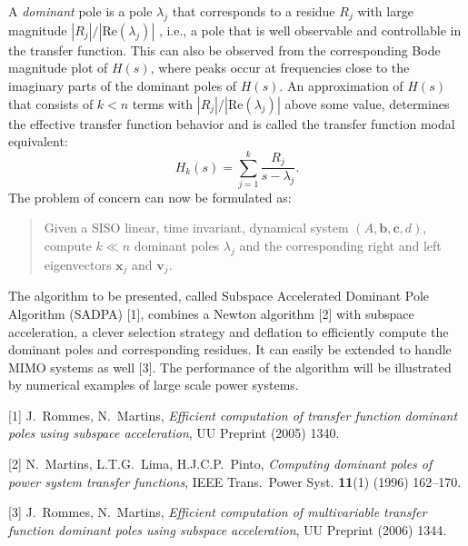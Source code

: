 \documentclass[twosided]{report}
\begin{document}
A \textit{dominant} pole is a pole $\lambda_j$ that
corresponds to a residue $R_j$ with large magnitude
$|R_j| / |\mbox{Re}(\lambda_j)|$ , i.e.,
a pole that is well
observable and controllable in the transfer function. This
can also be observed from the corresponding Bode magnitude
plot of $H(s)$, where peaks occur at frequencies close to
the imaginary parts of the dominant poles of $H(s)$. An
approximation of $H(s)$ that consists of $k<n$ terms with
$|R_j|/|\mbox{Re}(\lambda_j)|$ above some value, determines
the effective transfer function behavior and is called the
transfer function modal equivalent:
$$ H_k(s) = \sum_{j=1}^k \frac{R_j}{s - \lambda_j}. $$
The problem of concern can now be formulated as:
\begin{quote}
Given a SISO linear, time invariant,
dynamical system
$(A,\mathbf{b},\mathbf{c},d)$,
compute $k\ll n$ dominant
poles $\lambda_j$ and the corresponding right and left
eigenvectors $\mathbf{x}_j$ and $\mathbf{v}_j$.
\end{quote}

The algorithm to be presented, called Subspace Accelerated
Dominant Pole Algorithm (SADPA) [1],
combines a Newton
algorithm [2]
with subspace
acceleration, a clever selection strategy and deflation to
efficiently compute the dominant poles and corresponding
residues. It can easily be extended to handle MIMO systems
as well [3].
The performance of the algorithm will be illustrated by
numerical examples of large scale power systems.

[1] J.~Rommes, N.~Martins, {\em Efficient computation
of transfer function dominant poles using subspace
acceleration}, UU Preprint (2005) 1340.

[2] N.~Martins, L.T.G.~Lima, H.J.C.P.~Pinto,
{\em Computing dominant poles of power system transfer
functions}, IEEE Trans.~Power Syst. {\bf 11}(1)
(1996) 162--170.

[3] J.~Rommes, N.~Martins,
{\em Efficient computation of multivariable transfer
function dominant poles using subspace acceleration},
UU Preprint (2006) 1344.
\end{document}
